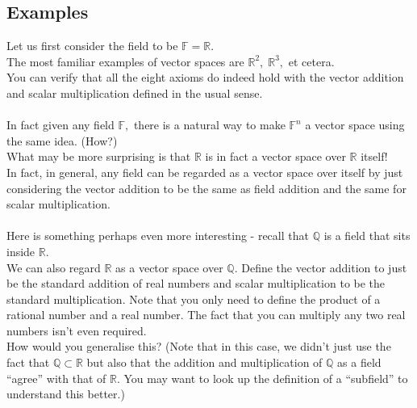 \documentclass[12pt]{article}
\begin{document}
\subsection{Examples}
Let us first consider the field to be $\mathbb{F} = \mathbb{R}.$\\
The most familiar examples of vector spaces are $\mathbb{R}^2,\;\mathbb{R}^3,$ et cetera.\\
You can verify that all the eight axioms do indeed hold with the vector addition and scalar multiplication defined in the usual sense.\\~\\
%
In fact given any field $\mathbb{F},$ there is a natural way to make $\mathbb{F}^n$ a vector space using the same idea. (How?)\\
What may be more surprising is that $\mathbb{R}$ is in fact a vector space over $\mathbb{R}$ itself!\\
In fact, in general, any field can be regarded as a vector space over itself by just considering the vector addition to be the same as field addition and the same for scalar multiplication.\\~\\
%
Here is something perhaps even more interesting - recall that $\mathbb{Q}$ is a field that sits inside $\mathbb{R}.$\\
We can also regard $\mathbb{R}$ as a vector space over $\mathbb{Q}.$ Define the vector addition to just be the standard addition of real numbers and scalar multiplication to be the standard multiplication. Note that you only need to define the product of a rational number and a real number. The fact that you can multiply any two real numbers isn't even required.\\
How would you generalise this? (Note that in this case, we didn't just use the fact that $\mathbb{Q} \subset \mathbb{R}$ but also that the addition and multiplication of $\mathbb{Q}$ as a field ``agree'' with that of $\mathbb{R}$. You may want to look up the definition of a ``subfield'' to understand this better.) 
\end{document}
